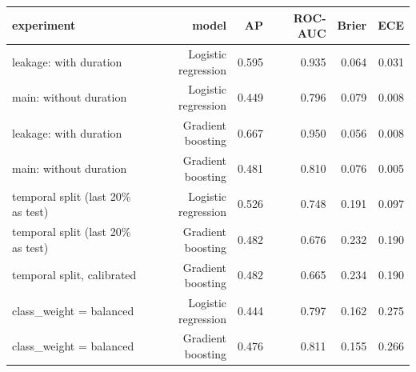 \begin{tabular}{lrrrrr}
\toprule
experiment & model & AP & ROC-AUC & Brier & ECE \\
\midrule
leakage: with duration & Logistic regression & 0.595 & 0.935 & 0.064 & 0.031 \\
main: without duration & Logistic regression & 0.449 & 0.796 & 0.079 & 0.008 \\
leakage: with duration & Gradient boosting & 0.667 & 0.950 & 0.056 & 0.008 \\
main: without duration & Gradient boosting & 0.481 & 0.810 & 0.076 & 0.005 \\
temporal split (last 20\% as test) & Logistic regression & 0.526 & 0.748 & 0.191 & 0.097 \\
temporal split (last 20\% as test) & Gradient boosting & 0.482 & 0.676 & 0.232 & 0.190 \\
temporal split, calibrated & Gradient boosting & 0.482 & 0.665 & 0.234 & 0.190 \\
class\_weight = balanced & Logistic regression & 0.444 & 0.797 & 0.162 & 0.275 \\
class\_weight = balanced & Gradient boosting & 0.476 & 0.811 & 0.155 & 0.266 \\
\bottomrule
\end{tabular}